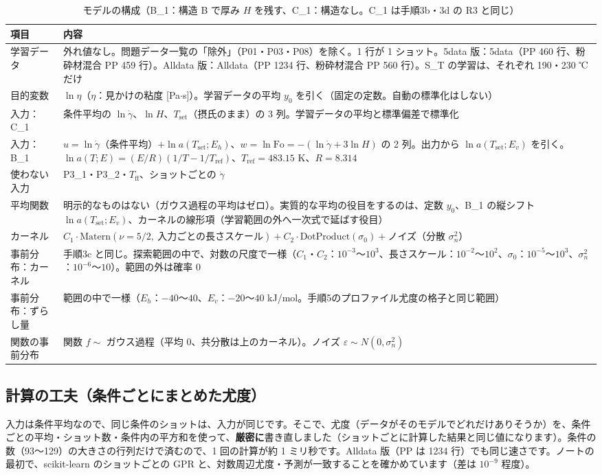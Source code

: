 \documentclass[paper=a4paper,fontsize=10.5pt,line_length=44zw,number_of_lines=38]{jlreq}
\newcommand{\gd}{\dot{\gamma}}
\newcommand{\Tff}{T_{\mathrm{ff}}}
\newcommand{\Tset}{T_{\mathrm{set}}}
\newcommand{\Eh}{E_{h}}
\newcommand{\Ev}{E_{v}}
\newcommand{\PI}{P3\_1}
\newcommand{\PII}{P3\_2}
\begin{document}
\begin{table}[H]
\caption{モデルの構成（B\_1：構造 B で厚み $H$ を残す、C\_1：構造なし。C\_1 は手順3b・3d の R3 と同じ）}\label{tab:model}
\small
\begin{tabularx}{\linewidth}{@{}l>{\raggedright\arraybackslash}X@{}}
\toprule
項目 & 内容 \\
\midrule
学習データ & 外れ値なし。問題データ一覧の「除外」（P01・P03・P08）を除く。1 行が 1 ショット。5data 版：5data（PP 460 行、粉砕材混合 PP 459 行）。Alldata 版：Alldata（PP 1234 行、粉砕材混合 PP 560 行）。S\_T の学習は、それぞれ 190・230 ℃ だけ \\
目的変数 & $\ln\eta$（$\eta$：見かけの粘度 [Pa$\cdot$s]）。学習データの平均 $y_0$ を引く（固定の定数。自動の標準化はしない） \\
入力：C\_1 & 条件平均の $\ln\gd$、$\ln H$、$\Tset$（摂氏のまま）の 3 列。学習データの平均と標準偏差で標準化 \\
入力：B\_1 & $u=\ln\gd$（条件平均）$+\ln a(\Tset;\Eh)$、$w=\ln\mathrm{Fo}=-(\ln\gd+3\ln H)$ の 2 列。出力から $\ln a(\Tset;\Ev)$ を引く。$\ln a(T;E)=(E/R)(1/T-1/T_{\mathrm{ref}})$、$T_{\mathrm{ref}}=483.15$ K、$R=8.314$ \\
使わない入力 & \PI・\PII・$\Tff$、ショットごとの $\gd$ \\
平均関数 & 明示的なものはない（ガウス過程の平均はゼロ）。実質的な平均の役目をするのは、定数 $y_0$、B\_1 の縦シフト $\ln a(\Tset;\Ev)$、カーネルの線形項（学習範囲の外へ一次式で延ばす役目） \\
カーネル & $C_1\cdot\mathrm{Matern}(\nu=5/2,\ \text{入力ごとの長さスケール})+C_2\cdot\mathrm{DotProduct}(\sigma_0)+$ノイズ（分散 $\sigma_n^2$） \\
事前分布：カーネル & 手順3c と同じ。探索範囲の中で、対数の尺度で一様（$C_1$・$C_2$：$10^{-3}$〜$10^{3}$、長さスケール：$10^{-2}$〜$10^{2}$、$\sigma_0$：$10^{-5}$〜$10^{3}$、$\sigma_n^2$：$10^{-6}$〜$10$）。範囲の外は確率 0 \\
事前分布：ずらし量 & 範囲の中で一様（$\Eh$：$-40$〜$40$、$\Ev$：$-20$〜$40$ kJ/mol。手順5のプロファイル尤度の格子と同じ範囲） \\
関数の事前分布 & 関数 $f\sim$ ガウス過程（平均 0、共分散は上のカーネル）。ノイズ $\varepsilon\sim N(0,\sigma_n^2)$ \\
\bottomrule
\end{tabularx}
\end{table}

\subsection{計算の工夫（条件ごとにまとめた尤度）}
入力は条件平均なので、同じ条件のショットは、入力が同じです。そこで、尤度（データがそのモデルでどれだけありそうか）を、条件ごとの平均・ショット数・条件内の平方和を使って、\textbf{厳密に}書き直しました（ショットごとに計算した結果と同じ値になります）。条件の数（93〜129）の大きさの行列だけで済むので、1 回の計算が約 1 ミリ秒です。Alldata 版（PP は 1234 行）でも同じ速さです。ノートの最初で、scikit-learn のショットごとの GPR と、対数周辺尤度・予測が一致することを確かめています（差は $10^{-9}$ 程度）。
\end{document}
